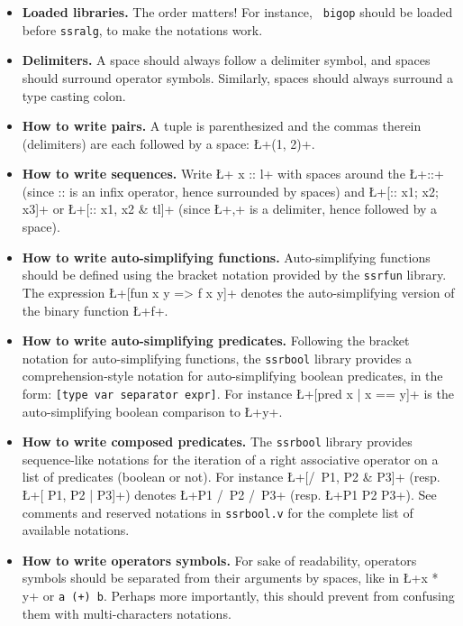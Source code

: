 \begin{itemize}
\item {\bf Loaded libraries.} The order matters! For instance, {\tt
    bigop} should be loaded before {\tt ssralg}, to make the
  notations work.

\item {\bf Delimiters.} A space should always follow a delimiter
  symbol, and spaces should surround operator symbols. Similarly,
  spaces should always surround a type casting colon.

\item {\bf How to write pairs.} A tuple is parenthesized and the
  commas therein (delimiters) are each followed by a space:
  \L+(1, 2)+.

\item {\bf How to write sequences.} Write \L+ x :: l+ with spaces around
  the \L+::+ (since :: is an infix operator, hence surrounded by
  spaces) and \L+[:: x1; x2; x3]+ or \L+[:: x1, x2 & tl]+ (since \L+,+
  is a delimiter, hence followed by a space).

\item  {\bf How to write auto-simplifying functions.} Auto-simplifying
  functions should be defined using the bracket notation provided by
  the \texttt{ssrfun} library. The expression \L+[fun x y => f x y]+
  denotes the auto-simplifying version of the binary function \L+f+.

\item {\bf How to write auto-simplifying predicates.} Following the
  bracket notation for auto-simplifying functions, the \texttt{ssrbool}
  library provides a
  comprehension-style notation for auto-simplifying boolean predicates,
  in the form: \texttt{[type var separator expr]}. For instance
  \L+[pred x | x == y]+ is the auto-simplifying boolean comparison to \L+y+.


\item {\bf How to write composed predicates.} The \texttt{ssrbool}
  library
  provides sequence-like notations for the
  iteration of a right associative operator on a list of
  predicates (boolean or not).
  For instance \L+[/\ P1, P2 & P3]+ (resp. \L+[\/ P1, P2 | P3]+)
  denotes \L+P1 /\ P2 /\ P3+ (resp. \L+P1 \/ P2 \/ P3+). See comments
  and reserved notations in \texttt{ssrbool.v} for the complete list of
   available notations.


\item {\bf How to write operators symbols.} For sake of readability,
  operators symbols should
  be separated from their arguments by spaces, like in \L+x * y+ or
  \texttt{a (+)  b}.
  Perhaps more importantly,  this should prevent
  \Coq{} from confusing them with multi-characters notations.


\end{itemize}
